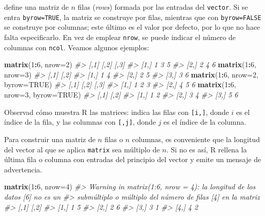 \documentclass[
]{book}
\newenvironment{Shaded}{\begin{snugshade}}{\end{snugshade}}
\newcommand{\CommentTok}[1]{\textcolor[rgb]{0.56,0.35,0.01}{\textit{#1}}}
\newcommand{\DataTypeTok}[1]{\textcolor[rgb]{0.13,0.29,0.53}{#1}}
\newcommand{\DecValTok}[1]{\textcolor[rgb]{0.00,0.00,0.81}{#1}}
\newcommand{\KeywordTok}[1]{\textcolor[rgb]{0.13,0.29,0.53}{\textbf{#1}}}
\newcommand{\NormalTok}[1]{#1}
\newcommand{\OperatorTok}[1]{\textcolor[rgb]{0.81,0.36,0.00}{\textbf{#1}}}
\newcommand{\OtherTok}[1]{\textcolor[rgb]{0.56,0.35,0.01}{#1}}
\theoremstyle{definition}
\theoremstyle{definition}
\theoremstyle{definition}
\theoremstyle{remark}
\begin{document}
define una matriz de \(n\) filas (\emph{rows}) formada por las entradas del \texttt{vector}. Si se entra \texttt{byrow=TRUE}, la matriz se construye por filas, mientras que con \texttt{byrow=FALSE} se construye por columnas; este último es el valor por defecto, por lo que no hace falta especificarlo. En vez de emplear \texttt{nrow}, se puede indicar el número de columnas con \texttt{ncol}. Veamos algunos ejemplos:

\begin{Shaded}
\begin{Highlighting}[]
\KeywordTok{matrix}\NormalTok{(}\DecValTok{1}\OperatorTok{:}\DecValTok{6}\NormalTok{, }\DataTypeTok{nrow=}\DecValTok{2}\NormalTok{)}
\CommentTok{\#\textgreater{}      [,1] [,2] [,3]}
\CommentTok{\#\textgreater{} [1,]    1    3    5}
\CommentTok{\#\textgreater{} [2,]    2    4    6}
\KeywordTok{matrix}\NormalTok{(}\DecValTok{1}\OperatorTok{:}\DecValTok{6}\NormalTok{, }\DataTypeTok{nrow=}\DecValTok{3}\NormalTok{)}
\CommentTok{\#\textgreater{}      [,1] [,2]}
\CommentTok{\#\textgreater{} [1,]    1    4}
\CommentTok{\#\textgreater{} [2,]    2    5}
\CommentTok{\#\textgreater{} [3,]    3    6}
\KeywordTok{matrix}\NormalTok{(}\DecValTok{1}\OperatorTok{:}\DecValTok{6}\NormalTok{, }\DataTypeTok{nrow=}\DecValTok{2}\NormalTok{, }\DataTypeTok{byrow=}\OtherTok{TRUE}\NormalTok{)}
\CommentTok{\#\textgreater{}      [,1] [,2] [,3]}
\CommentTok{\#\textgreater{} [1,]    1    2    3}
\CommentTok{\#\textgreater{} [2,]    4    5    6}
\KeywordTok{matrix}\NormalTok{(}\DecValTok{1}\OperatorTok{:}\DecValTok{6}\NormalTok{, }\DataTypeTok{nrow=}\DecValTok{3}\NormalTok{, }\DataTypeTok{byrow=}\OtherTok{TRUE}\NormalTok{)}
\CommentTok{\#\textgreater{}      [,1] [,2]}
\CommentTok{\#\textgreater{} [1,]    1    2}
\CommentTok{\#\textgreater{} [2,]    3    4}
\CommentTok{\#\textgreater{} [3,]    5    6}
\end{Highlighting}
\end{Shaded}

Observad cómo muestra R las matrices: indica las filas con \texttt{{[}i,{]}}, donde \(i\) es el índice de la fila, y las columnas con \texttt{{[},j{]}}, donde \(j\) es el índice de la columna.

Para construir una matriz de \(n\) filas o \(n\) columnas, es conveniente que la longitud del vector al que se aplica \texttt{matrix} sea múltiplo de \(n\). Si no es así, R rellena la última fila o columna con entradas del principio del vector y emite un mensaje de advertencia.

\begin{Shaded}
\begin{Highlighting}[]
\KeywordTok{matrix}\NormalTok{(}\DecValTok{1}\OperatorTok{:}\DecValTok{6}\NormalTok{, }\DataTypeTok{nrow=}\DecValTok{4}\NormalTok{)}
\CommentTok{\#\textgreater{} Warning in matrix(1:6, nrow = 4): la longitud de los datos [6] no es un}
\CommentTok{\#\textgreater{} submúltiplo o múltiplo del número de filas [4] en la matriz}
\CommentTok{\#\textgreater{}      [,1] [,2]}
\CommentTok{\#\textgreater{} [1,]    1    5}
\CommentTok{\#\textgreater{} [2,]    2    6}
\CommentTok{\#\textgreater{} [3,]    3    1}
\CommentTok{\#\textgreater{} [4,]    4    2}
\end{Highlighting}
\end{Shaded}
\end{document}
